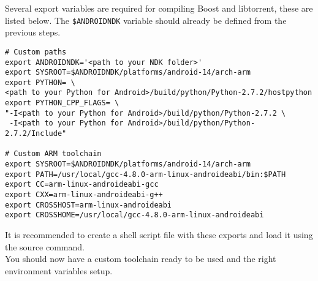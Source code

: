 	Several export variables are required for compiling Boost and libtorrent, these are listed below. The \texttt{\$ANDROIDNDK} variable should already be defined from the previous steps.
	\begin{lstlisting}
# Custom paths
export ANDROIDNDK='<path to your NDK folder>'
export SYSROOT=$ANDROIDNDK/platforms/android-14/arch-arm
export PYTHON= \ 
<path to your Python for Android>/build/python/Python-2.7.2/hostpython
export PYTHON_CPP_FLAGS= \
"-I<path to your Python for Android>/build/python/Python-2.7.2 \
 -I<path to your Python for Android>/build/python/Python-2.7.2/Include"
	 
# Custom ARM toolchain
export SYSROOT=$ANDROIDNDK/platforms/android-14/arch-arm
export PATH=/usr/local/gcc-4.8.0-arm-linux-androideabi/bin:$PATH
export CC=arm-linux-androideabi-gcc
export CXX=arm-linux-androideabi-g++
export CROSSHOST=arm-linux-androideabi
export CROSSHOME=/usr/local/gcc-4.8.0-arm-linux-androideabi
	\end{lstlisting}
	It is recommended to create a shell script file with these exports and load it using the source command.\\
	You should now have a custom toolchain ready to be used and the right environment variables setup.